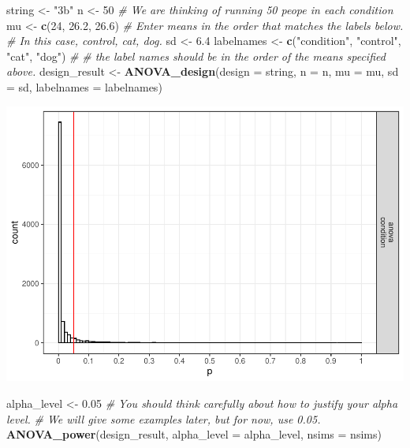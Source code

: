 \documentclass[]{book}
\newenvironment{Shaded}{\begin{snugshade}}{\end{snugshade}}
\newcommand{\CommentTok}[1]{\textcolor[rgb]{0.56,0.35,0.01}{\textit{#1}}}
\newcommand{\DataTypeTok}[1]{\textcolor[rgb]{0.13,0.29,0.53}{#1}}
\newcommand{\DecValTok}[1]{\textcolor[rgb]{0.00,0.00,0.81}{#1}}
\newcommand{\FloatTok}[1]{\textcolor[rgb]{0.00,0.00,0.81}{#1}}
\newcommand{\KeywordTok}[1]{\textcolor[rgb]{0.13,0.29,0.53}{\textbf{#1}}}
\newcommand{\NormalTok}[1]{#1}
\newcommand{\StringTok}[1]{\textcolor[rgb]{0.31,0.60,0.02}{#1}}
\begin{document}
\begin{Shaded}
\begin{Highlighting}[]
\NormalTok{string <-}\StringTok{ "3b"}
\NormalTok{n <-}\StringTok{ }\DecValTok{50}
\CommentTok{# We are thinking of running 50 peope in each condition}
\NormalTok{mu <-}\StringTok{ }\KeywordTok{c}\NormalTok{(}\DecValTok{24}\NormalTok{, }\FloatTok{26.2}\NormalTok{, }\FloatTok{26.6}\NormalTok{)}
\CommentTok{# Enter means in the order that matches the labels below.}
\CommentTok{# In this case, control, cat, dog. }
\NormalTok{sd <-}\StringTok{ }\FloatTok{6.4}
\NormalTok{labelnames <-}\StringTok{ }\KeywordTok{c}\NormalTok{(}\StringTok{"condition"}\NormalTok{, }\StringTok{"control"}\NormalTok{, }\StringTok{"cat"}\NormalTok{, }\StringTok{"dog"}\NormalTok{) }\CommentTok{#}
\CommentTok{# the label names should be in the order of the means specified above.}
\NormalTok{design_result <-}\StringTok{ }\KeywordTok{ANOVA_design}\NormalTok{(}\DataTypeTok{design =}\NormalTok{ string,}
                   \DataTypeTok{n =}\NormalTok{ n, }
                   \DataTypeTok{mu =}\NormalTok{ mu, }
                   \DataTypeTok{sd =}\NormalTok{ sd, }
                   \DataTypeTok{labelnames =}\NormalTok{ labelnames)}
\end{Highlighting}
\end{Shaded}

\includegraphics{SuperpowerValidation_files/figure-latex/unnamed-chunk-15-1.pdf}

\begin{Shaded}
\begin{Highlighting}[]
\NormalTok{alpha_level <-}\StringTok{ }\FloatTok{0.05}
\CommentTok{# You should think carefully about how to justify your alpha level.}
\CommentTok{# We will give some examples later, but for now, use 0.05.}
\KeywordTok{ANOVA_power}\NormalTok{(design_result, }\DataTypeTok{alpha_level =}\NormalTok{ alpha_level, }\DataTypeTok{nsims =}\NormalTok{ nsims)}
\end{Highlighting}
\end{Shaded}
\end{document}
